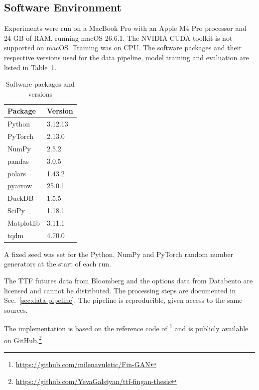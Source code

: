 \subsection{Software Environment}\label{sec:software}
Experiments were run on a MacBook Pro with an Apple M4 Pro processor and 24 GB of RAM, running macOS 26.6.1. The NVIDIA CUDA toolkit is not supported on macOS. Training was on CPU. The software packages and their respective versions used for the data pipeline, model training and evaluation are listed in Table~\ref{tab:software}.

\begin{table}[htbp]
\centering
\begin{tabular}{ll}
\toprule
Package & Version \\
\midrule
Python & 3.12.13 \\
PyTorch & 2.13.0 \\
NumPy & 2.5.2 \\
pandas & 3.0.5 \\
polars & 1.43.2 \\
pyarrow & 25.0.1 \\
DuckDB & 1.5.5 \\
SciPy & 1.18.1 \\
Matplotlib & 3.11.1 \\
tqdm & 4.70.0 \\
\bottomrule
\end{tabular}
\caption{Software packages and versions}
\label{tab:software}
\end{table}
A fixed seed was set for the Python, NumPy and PyTorch random number
generators at the start of each run.

The TTF futures data from Bloomberg and the options data from Databento are licensed and cannot be distributed. The processing steps are documented in Sec.~\ref{sec:data-pipeline}. The pipeline is reproducible, given access to the same sources.

The implementation is based on the reference code of
\textcite{vuleticFinGANForecastingClassifying2024}\footnote{\url{https://github.com/milenavuletic/Fin-GAN}}
and is publicly available on
GitHub.\footnote{\url{https://github.com/YevaGalstyan/ttf-fingan-thesis}}

